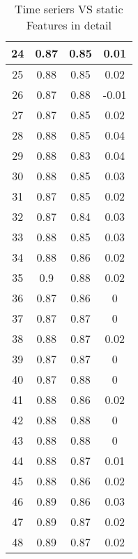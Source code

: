 \begin{table}[]
\begin{tabular}{|c|c c c|}
24   & 0.87              & 0.85         & 0.01       \\\hline
25   & 0.88              & 0.85         & 0.02       \\
26   & 0.87              & 0.88         & -0.01      \\
27   & 0.87              & 0.85         & 0.02       \\
28   & 0.88              & 0.85         & 0.04       \\
29   & 0.88              & 0.83         & 0.04       \\
30   & 0.88              & 0.85         & 0.03       \\\hline
31   & 0.87              & 0.85         & 0.02       \\
32   & 0.87              & 0.84         & 0.03       \\
33   & 0.88              & 0.85         & 0.03       \\
34   & 0.88              & 0.86         & 0.02       \\
35   & 0.9               & 0.88         & 0.02       \\
36   & 0.87              & 0.86         & 0          \\\hline
37   & 0.87              & 0.87         & 0          \\
38   & 0.88              & 0.87         & 0.02       \\
39   & 0.87              & 0.87         & 0          \\
40   & 0.87              & 0.88         & 0          \\
41   & 0.88              & 0.86         & 0.02       \\
42   & 0.88              & 0.88         & 0          \\\hline
43   & 0.88              & 0.88         & 0          \\
44   & 0.88              & 0.87         & 0.01       \\
45   & 0.88              & 0.86         & 0.02       \\
46   & 0.89              & 0.86         & 0.03       \\
47   & 0.89              & 0.87         & 0.02       \\
48   & 0.89              & 0.87         & 0.02      \\\hline

\end{tabular}
\caption{Time seriers VS static Features in detail}
\label{TSVSSFFULL}
\end{table}
 \restoregeometry

